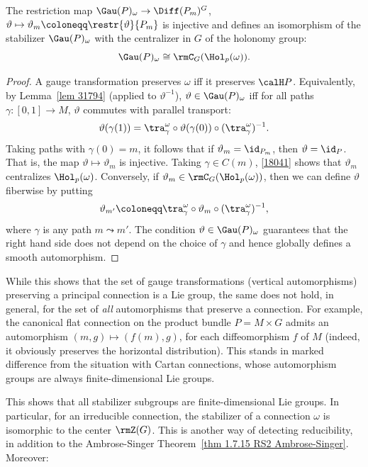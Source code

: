 \begin{prop}\label{prop gauge group of principal connection}
    The restriction map $\Gau(P)_\omega\to \Diff(P_m)^G$, $\vartheta\mapsto \vartheta_m\coloneqq\restr{\vartheta}{P_m}$ is injective and defines an isomorphism of the stabilizer $\Gau(P)_\omega$ with the centralizer in $G$ of the holonomy group:
    \[\Gau(P)_\omega\cong \rmC_G(\Hol_p(\omega)).\]
\end{prop}
\begin{proof}
    A gauge transformation preserves $\omega$ iff it preserves $\calH P$. Equivalently, by Lemma~\ref{lem 31794} (applied to $\vartheta^{-1}$), $\vartheta\in\Gau(P)_\omega$ iff for all paths $\gamma:[0,1]\to M$, $\vartheta$ commutes with parallel transport:
    \[\vartheta(\gamma(1))=\tra_\gamma^\omega\circ \vartheta(\gamma(0))\circ(\tra_\gamma^\omega)^{-1}.\label{18041}\]
    Taking paths with $\gamma(0)=m$, it follows that if $\vartheta_m=\id_{P_m}$, then $\vartheta=\id_P$. That is, the map $\vartheta\mapsto\vartheta_m$ is injective. Taking $\gamma\in C(m)$, \eqref{18041} shows that $\vartheta_m$ centralizes $\Hol_p(\omega)$. Conversely, if $\vartheta_m\in \rmC_G(\Hol_p(\omega))$, then we can define $\vartheta$ fiberwise by putting
    \[\vartheta_{m'}\coloneqq \tra_\gamma^\omega\circ \vartheta_m\circ (\tra_\gamma^\omega)^{-1},\]
    where $\gamma$ is any path $m\leadsto m'$. The condition $\vartheta\in \Gau(P)_\omega$ guarantees that the right hand side does not depend on the choice of $\gamma$ and hence globally defines a smooth automorphism.
\end{proof}

\begin{rem}\label{rem automorphisms of principal connection}
    While this shows that the set of gauge transformations (vertical automorphisms) preserving a principal connection is a Lie group, the same does not hold, in general, for the set of \emph{all} automorphisms that preserve a connection. For example, the canonical flat connection on the product bundle $P=M\times G$ admits an automorphism $(m,g)\mapsto (f(m),g)$, for each diffeomorphism $f$ of $M$ (indeed, it obviously preserves the horizontal distribution). This stands in marked difference from the situation with Cartan connections, whose automorphism groups are always finite-dimensional Lie groups.
\end{rem}

This shows that all stabilizer subgroups are finite-dimensional Lie groups. In particular, for an irreducible connection, the stabilizer of a connection $\omega$ is isomorphic to the center $\rmZ(G)$. This is another way of detecting reducibility, in addition to the Ambrose-Singer Theorem~\ref{thm 1.7.15 RS2 Ambrose-Singer}. Moreover:

